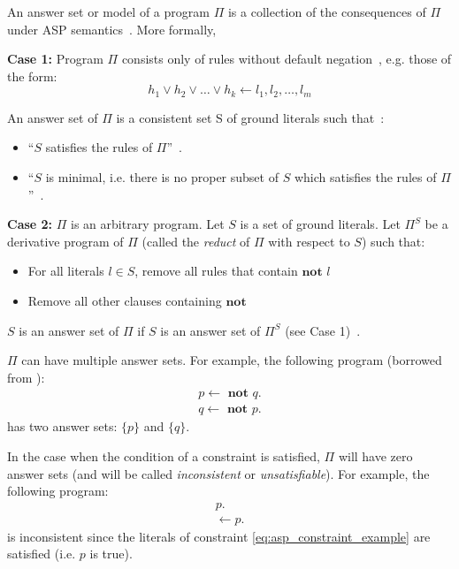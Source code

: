 \begin{definition}
    An answer set or model of a program $\Pi$ is a collection of the consequences of $\Pi$ under ASP semantics~\citep{balduccini_asp_2011}.
    More formally,

    \textbf{Case 1:} Program $\Pi$ consists only of rules without default negation~\citep{blount_architecture_2013}, e.g. those of the form:
    \begin{equation}
        h_1 \lor h_2 \lor \dots \lor h_k \leftarrow l_1, l_2, \dots, l_m
    \end{equation}

    An answer set of $\Pi$ is a consistent set S of ground literals such that~\citep{blount_architecture_2013}:
    \begin{itemize}
        \item ``$S$ satisfies the rules of $\Pi$''~\citep{blount_architecture_2013}.
        \item ``$S$ is minimal, i.e. there is no proper subset of $S$ which satisfies the rules of $\Pi$''~\citep{blount_architecture_2013}.
    \end{itemize}

    \textbf{Case 2:} $\Pi$ is an arbitrary program.
    Let $S$ is a set of ground literals.
    Let $\Pi^S$ be a derivative program of $\Pi$ (called the \textit{reduct} of $\Pi$ with respect to $S$) such that:
    \begin{itemize}
        \item For all literals $l \in S$, remove all rules that contain $\textbf{not } l$
        \item Remove all other clauses containing $\textbf{not}$
    \end{itemize}
    $S$ is an answer set of $\Pi$ if $S$ is an answer set of $\Pi^S$ (see Case 1)~\citep{blount_architecture_2013}.
\end{definition}

$\Pi$ can have multiple answer sets.
For example, the following program (borrowed from \citet{balduccini_asp_2011}):
\begin{gather}
    p \leftarrow \textbf{ not } q. \\
    q \leftarrow \textbf{ not } p.
\end{gather}
has two answer sets: $\{p\}$ and $\{q\}$.

In the case when the condition of a constraint is satisfied, $\Pi$ will have zero answer sets (and will be called \textit{inconsistent} or \textit{unsatisfiable}).
For example, the following program:
\begin{gather}
    p. \\
    \leftarrow p. \label{eq:asp_constraint_example}
\end{gather}
is inconsistent since the literals of constraint \ref{eq:asp_constraint_example} are satisfied (i.e. $p$ is true).

